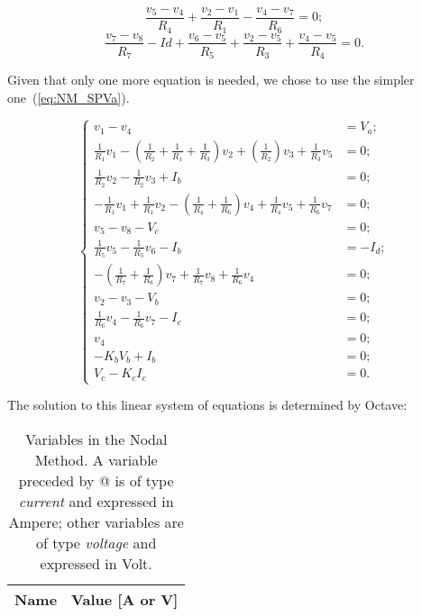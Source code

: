 \begin{equation}
  \frac{v_5-v_4}{R_4} + \frac{v_2-v_1}{R_1} - \frac{v_4-v_7}{R_6} = 0;
  \label{eq:NM_SPVa}
\end{equation}
\begin{equation}
  \frac{v_7-v_8}{R_7} - Id + \frac{v_6-v_5}{R_5} + \frac{v_2-v_5}{R_3} + \frac{v_4-v_5}{R_4} = 0.
  \label{eq:NM_SPVc}
\end{equation}

Given that only one more equation is needed, we chose to use the simpler one~(\ref{eq:NM_SPVa}).

\begin{equation}
\begin{cases}
	v_1 - v_4 &= V_a;																				  \\
	\frac{1}{R_1}v_1 - (\frac{1}{R_2}+\frac{1}{R_1}+\frac{1}{R_3})v_2 + (\frac{1}{R_2})v_3 + \frac{1}{R_3}v_5 &= 0; \\
  	\frac{1}{R_2}v_2 - \frac{1}{R_2}v_3+ I_b &= 0;													  \\
  	-\frac{1}{R_1}v_1 + \frac{1}{R_1}v_2 - (\frac{1}{R_4}+\frac{1}{R_6})v_4 + \frac{1}{R_4}v_5 + \frac{1}{R_6}v_7 &= 0;			  																	  \\
	v_5 - v_8 - V_c &= 0;																			  \\
  	\frac{1}{R_5}v_5 - \frac{1}{R_5}v_6 - I_b &= -I_d;												  \\
  	-(\frac{1}{R_7}+\frac{1}{R_6})v_7 + \frac{1}{R_7}v_8 + \frac{1}{R_6}v_4 &= 0;					  \\
	v_2 - v_3 - V_b &= 0;																			  \\
  	\frac{1}{R_6}v_4 - \frac{1}{R_6}v_7 - I_c &= 0;													  \\
  	v_4 &= 0;																						  \\
  	-K_bV_b + I_b &= 0;																				  \\
  	V_c - K_cI_c &= 0.
\end{cases}
\end{equation}

The solution to this linear system of equations is determined by Octave:

\begin{table}[h]
  \centering
  \begin{tabular}{|l|r|}
  \hline  
    {\bf Name} & {\bf Value [A or V]} \\ \hline
    
  \end{tabular}
  \caption{Variables in the Nodal Method. A variable preceded by @ is of type {\em current} and expressed in Ampere; other variables are of type {\em voltage} and expressed in Volt.}
  \label{tab:nos}
\end{table}

